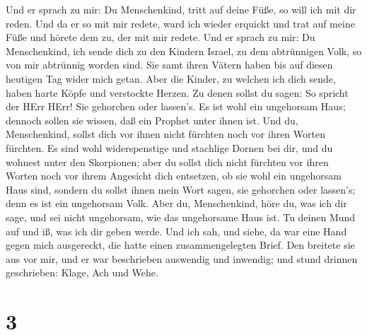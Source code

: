  Und er sprach zu mir: Du Menschenkind, tritt auf deine
Füße, so will ich mit dir reden.  Und da er so mit mir
redete, ward ich wieder erquickt und trat auf meine Füße und hörete dem
zu, der mit mir redete.  Und er sprach zu mir: Du
Menschenkind, ich sende dich zu den Kindern Israel, zu dem abtrünnigen
Volk, so von mir abtrünnig worden sind. Sie samt ihren Vätern haben bis
auf diesen heutigen Tag wider mich getan.  Aber die Kinder,
zu welchen ich dich sende, haben harte Köpfe und verstockte Herzen. Zu
denen sollst du sagen: So spricht der HErr HErr!  Sie
gehorchen oder lassen's. Es ist wohl ein ungehorsam Haus; dennoch sollen
sie wissen, daß ein Prophet unter ihnen ist.  Und du,
Menschenkind, sollst dich vor ihnen nicht fürchten noch vor ihren Worten
fürchten. Es sind wohl widerspenstige und stachlige Dornen bei dir, und
du wohnest unter den Skorpionen; aber du sollst dich nicht fürchten vor
ihren Worten noch vor ihrem Angesicht dich entsetzen, ob sie wohl ein
ungehorsam Haus sind,  sondern du sollst ihnen mein Wort
sagen, sie gehorchen oder lassen's; denn es ist ein ungehorsam Volk.
 Aber du, Menschenkind, höre du, was ich dir sage, und sei
nicht ungehorsam, wie das ungehorsame Haus ist. Tu deinen Mund auf und
iß, was ich dir geben werde.  Und ich sah, und siehe, da war
eine Hand gegen mich ausgereckt, die hatte einen zusammengelegten Brief.
 Den breitete sie aus vor mir, und er war beschrieben
auswendig und inwendig; und stund drinnen geschrieben: Klage, Ach und
Wehe.

\hypertarget{section-2}{%
\section{3}\label{section-2}}

